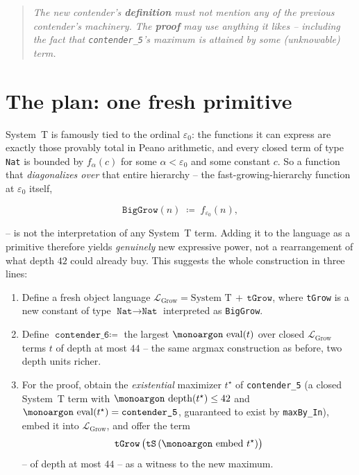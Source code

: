 \documentclass[11pt,a4paper]{article}
\theoremstyle{plain}
\theoremstyle{definition}
\theoremstyle{remark}
\newcommand{\opname}[1]{\mathop{\text{\monoargon #1}}\nolimits}
\newcommand{\depth}{\opname{depth}}
\newcommand{\eval}{\opname{eval}}
\newcommand{\embed}{\opname{embed}}
\begin{document}
\begin{quote}
\emph{The new contender's \textbf{definition} must not mention any of
the previous contender's machinery.  The \textbf{proof} may use
anything it likes -- including the fact that \texttt{contender\_5}'s
maximum is attained by some (unknowable) term.}
\end{quote}

\section{The plan: one fresh primitive}
\label{sec:plan}

System~T is famously tied to the ordinal $\varepsilon_0$: the
functions it can express are exactly those provably total in Peano
arithmetic, and every closed term of type \texttt{Nat} is bounded by
$f_\alpha(c)$ for some $\alpha < \varepsilon_0$ and some constant $c$.
So a function that \emph{diagonalizes over} that entire hierarchy --
the fast-growing-hierarchy function at $\varepsilon_0$ itself,

\[
   \texttt{BigGrow}(n) \;\coloneqq\; f_{\varepsilon_0}(n),
\]

-- is not the interpretation of any System~T term.  Adding it to the
language as a primitive therefore yields \emph{genuinely} new
expressive power, not a rearrangement of what depth $42$ could already
buy.  This suggests the whole construction in three lines:

\begin{enumerate}[leftmargin=2em,label=(\arabic*)]
  \item Define a fresh object language
        $\mathcal{L}_{\textrm{Grow}} = \text{System~T} \,+\, \texttt{tGrow}$,
        where \texttt{tGrow} is a new constant of type
        $\texttt{Nat}\to\texttt{Nat}$ interpreted as \texttt{BigGrow}.
  \item Define
        $\texttt{contender\_6} \coloneqq$ the largest $\eval(t)$ over
        closed $\mathcal{L}_{\textrm{Grow}}$ terms $t$ of depth at
        most $44$ -- the same argmax construction as before, two depth
        units richer.
  \item For the proof, obtain the \emph{existential} maximizer
        $t^\star$ of \texttt{contender\_5} (a closed System~T term
        with $\depth(t^\star)\leq 42$ and
        $\eval(t^\star)=\texttt{contender\_5}$, guaranteed to exist
        by \texttt{maxBy\_In}), embed it into
        $\mathcal{L}_{\textrm{Grow}}$, and offer the term
        \[
          \texttt{tGrow}\,\bigl(\texttt{tS}\,(\embed\,t^\star)\bigr)
        \]
        -- of depth at most $44$ -- as a witness to the new maximum.
\end{enumerate}
\end{document}
